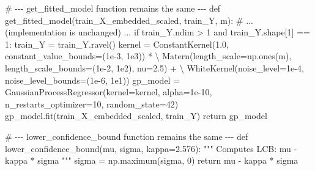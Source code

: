 \documentclass[
  letterpaper,
  DIV=11,
  numbers=noendperiod]{scrartcl}
\newenvironment{Shaded}{\begin{snugshade}}{\end{snugshade}}
\newcommand{\CommentTok}[1]{\textcolor[rgb]{0.37,0.37,0.37}{#1}}
\newcommand{\ControlFlowTok}[1]{\textcolor[rgb]{0.00,0.23,0.31}{#1}}
\newcommand{\DecValTok}[1]{\textcolor[rgb]{0.68,0.00,0.00}{#1}}
\newcommand{\FloatTok}[1]{\textcolor[rgb]{0.68,0.00,0.00}{#1}}
\newcommand{\KeywordTok}[1]{\textcolor[rgb]{0.00,0.23,0.31}{#1}}
\newcommand{\NormalTok}[1]{\textcolor[rgb]{0.00,0.23,0.31}{#1}}
\newcommand{\OperatorTok}[1]{\textcolor[rgb]{0.37,0.37,0.37}{#1}}
\begin{document}
\begin{Shaded}
\begin{Highlighting}[]
\CommentTok{\# {-}{-}{-} get\_fitted\_model function remains the same {-}{-}{-}}
\KeywordTok{def}\NormalTok{ get\_fitted\_model(train\_X\_embedded\_scaled, train\_Y, m):}
    \CommentTok{\# ... (implementation is unchanged) ...}
    \ControlFlowTok{if}\NormalTok{ train\_Y.ndim }\OperatorTok{\textgreater{}} \DecValTok{1} \KeywordTok{and}\NormalTok{ train\_Y.shape[}\DecValTok{1}\NormalTok{] }\OperatorTok{==} \DecValTok{1}\NormalTok{: train\_Y }\OperatorTok{=}\NormalTok{ train\_Y.ravel()}
\NormalTok{    kernel }\OperatorTok{=}\NormalTok{ ConstantKernel(}\FloatTok{1.0}\NormalTok{, constant\_value\_bounds}\OperatorTok{=}\NormalTok{(}\FloatTok{1e{-}3}\NormalTok{, }\FloatTok{1e3}\NormalTok{)) }\OperatorTok{*} \OperatorTok{\textbackslash{}}
\NormalTok{             Matern(length\_scale}\OperatorTok{=}\NormalTok{np.ones(m), length\_scale\_bounds}\OperatorTok{=}\NormalTok{(}\FloatTok{1e{-}2}\NormalTok{, }\FloatTok{1e2}\NormalTok{), nu}\OperatorTok{=}\FloatTok{2.5}\NormalTok{) }\OperatorTok{+} \OperatorTok{\textbackslash{}}
\NormalTok{             WhiteKernel(noise\_level}\OperatorTok{=}\FloatTok{1e{-}4}\NormalTok{, noise\_level\_bounds}\OperatorTok{=}\NormalTok{(}\FloatTok{1e{-}6}\NormalTok{, }\FloatTok{1e1}\NormalTok{))}
\NormalTok{    gp\_model }\OperatorTok{=}\NormalTok{ GaussianProcessRegressor(kernel}\OperatorTok{=}\NormalTok{kernel, alpha}\OperatorTok{=}\FloatTok{1e{-}10}\NormalTok{, n\_restarts\_optimizer}\OperatorTok{=}\DecValTok{10}\NormalTok{, random\_state}\OperatorTok{=}\DecValTok{42}\NormalTok{)}
\NormalTok{    gp\_model.fit(train\_X\_embedded\_scaled, train\_Y)}
    \ControlFlowTok{return}\NormalTok{ gp\_model}


\CommentTok{\# {-}{-}{-} lower\_confidence\_bound function remains the same {-}{-}{-}}
\KeywordTok{def}\NormalTok{ lower\_confidence\_bound(mu, sigma, kappa}\OperatorTok{=}\FloatTok{2.576}\NormalTok{):}
    \CommentTok{""" Computes LCB: mu {-} kappa * sigma """}
\NormalTok{    sigma }\OperatorTok{=}\NormalTok{ np.maximum(sigma, }\DecValTok{0}\NormalTok{)}
    \ControlFlowTok{return}\NormalTok{ mu }\OperatorTok{{-}}\NormalTok{ kappa }\OperatorTok{*}\NormalTok{ sigma}



\end{Highlighting}
\end{Shaded}
\end{document}
